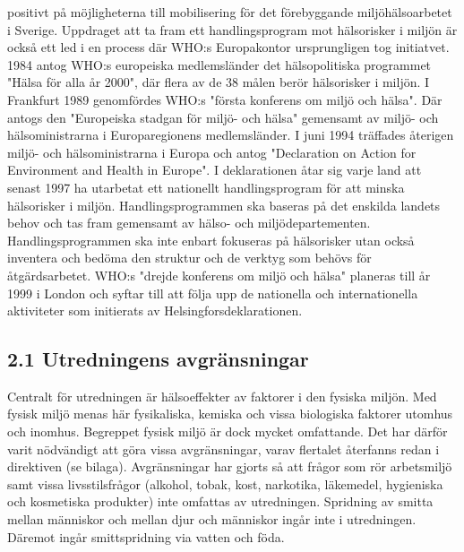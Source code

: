 positivt på möjligheterna till mobilisering för det förebyggande miljöhälsoarbetet i Sverige.
Uppdraget att ta fram ett handlingsprogram mot hälsorisker i miljön är också ett led i en process där WHO:s Europakontor ursprungligen tog initiatvet. 1984 antog WHO:s europeiska medlemsländer det hälsopolitiska programmet "Hälsa för alla år 2000", där flera av de 38 målen berör hälsorisker i miljön. I Frankfurt 1989 genomfördes WHO:s "första konferens om miljö och hälsa". Där antogs den "Europeiska stadgan för miljö- och hälsa" gemensamt av miljö- och hälsoministrarna i Europaregionens medlemsländer.
I juni 1994 träffades återigen miljö- och hälsoministrarna i Europa och antog "Declaration on Action for Environment and Health in Europe". I deklarationen åtar sig varje land att senast 1997 ha utarbetat ett nationellt handlingsprogram för att minska hälsorisker i miljön. Handlingsprogrammen ska baseras på det enskilda landets behov och tas fram gemensamt av hälso- och miljödepartementen. Handlingsprogrammen ska inte enbart fokuseras på hälsorisker utan också inventera och bedöma den struktur och de verktyg som behövs för åtgärdsarbetet.
WHO:s "drejde konferens om miljö och hälsa" planeras till år 1999 i London och syftar till att följa upp de nationella och internationella aktiviteter som initierats av Helsingforsdeklarationen.
\subsection*{2.1 Utredningens avgränsningar}
Centralt för utredningen är hälsoeffekter av faktorer i den fysiska miljön. Med fysisk miljö menas här fysikaliska, kemiska och vissa biologiska faktorer utomhus och inomhus. Begreppet fysisk miljö är dock mycket omfattande. Det har därför varit nödvändigt att göra vissa avgränsningar, varav flertalet återfanns redan i direktiven (se bilaga).
Avgränsningar har gjorts så att frågor som rör arbetsmiljö samt vissa livsstilsfrågor (alkohol, tobak, kost, narkotika, läkemedel, hygieniska och kosmetiska produkter) inte omfattas av utredningen. Spridning av smitta mellan människor och mellan djur och människor ingår inte i utredningen. Däremot ingår smittspridning via vatten och föda.

